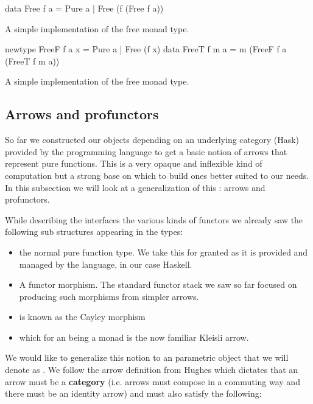 \begin{code}
\begin{haskellcode}
data Free f a
  = Pure a
  | Free (f (Free f a))
\end{haskellcode}
  \caption{\label{lst:free_def_naive}A simple implementation of the free
    monad type.}
\end{code}

\begin{code}
\begin{haskellcode}
newtype FreeF f a x = Pure a | Free (f x)
data FreeT f m a = m (FreeF f a (FreeT f m a))
\end{haskellcode}
\label{lst:free_def}
\caption{A simple implementation of the free monad type.}
\end{code}

\subsection{Arrows and profunctors}

So far we constructed our objects depending on an underlying category
(Hask) provided by the programming language to get a basic notion of
arrows that represent pure functions. This is a very opaque and
inflexible kind of computation but a strong base on which to build
ones better suited to our needs. In this subsection we will look at a
generalization of this : arrows and profunctors.

While describing the interfaces the various kinds of functors we
already saw the following sub structures appearing in the types:

\begin{itemize}
\item {} the normal pure function type. We take this for granted as
it is provided and managed by the language, in our case Haskell.
\item {} A functor morphism. The standard functor stack we saw
so far focused on producing such morphisms from simpler arrows.
\item {} is known as the Cayley morphism
\item {} which for an  being a monad is the now familiar
Kleisli arrow.
\end{itemize}

We would like to generalize this notion to an parametric object that
we will denote as \hask{~>}. We follow the arrow definition from
Hughes \cite{hughesProgrammingArrows2005} which dictates that an arrow
must be a \textbf{category} (i.e. arrows must compose in a commuting
way and there must be an identity arrow) and must also satisfy the
following:

